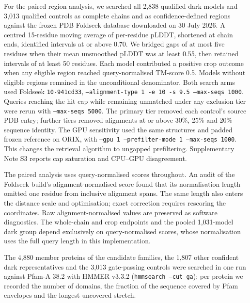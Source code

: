 \documentclass[11pt]{article}
\begin{document}
For the paired region analysis, we searched all 2{,}838 qualified dark models and 3{,}013
qualified controls as complete chains and as confidence-defined regions against the frozen
PDB Foldseek database downloaded on 30 July 2026. A centred 15-residue moving average of
per-residue pLDDT, shortened at chain ends, identified intervals at or above 0.70.
We bridged gaps of at most five residues when their mean unsmoothed pLDDT was at least 0.55,
then retained intervals of at least 50 residues. Each model contributed a positive crop outcome
when any eligible region reached query-normalised TM-score 0.5. Models without eligible
regions remained in the unconditional denominator. Both search arms used Foldseek
\texttt{10-941cd33}, \texttt{--alignment-type 1 -e 10 -s 9.5 --max-seqs 1000}.
Queries reaching the hit cap while remaining unmatched under any exclusion tier were rerun
with \texttt{--max-seqs 5000}. The primary tier removed each control's source PDB entry;
further tiers removed alignments at or above 30\%, 25\% and 20\% sequence identity.
The GPU sensitivity used the same structures and padded frozen reference on ORIX, with
\texttt{--gpu 1 --prefilter-mode 1 --max-seqs 1000}. This changes the retrieval algorithm to
ungapped prefiltering. Supplementary Note S3 reports cap saturation and CPU--GPU disagreement.

The paired analysis uses query-normalised scores throughout. An audit of the Foldseek build's
alignment-normalised score found that its normalisation length omitted one residue from
inclusive alignment spans. The same length also enters the distance scale and optimisation;
exact correction requires rescoring the coordinates. Raw alignment-normalised values are
preserved as software diagnostics. The whole-chain and crop endpoints and the pooled
1{,}031-model dark group depend exclusively on query-normalised scores, whose normalisation
uses the full query length in this implementation.


The 4{,}880 member proteins of
the candidate families, the 1{,}807 other confident dark representatives and the 3{,}013 gate-passing
controls were searched in one run against Pfam-A 38.2 with HMMER v3.3.2 (\texttt{hmmsearch --cut\_ga});
per protein we recorded the number of domains, the fraction of the sequence covered by Pfam
envelopes and the longest uncovered stretch.
\end{document}
